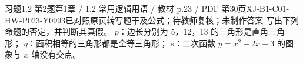\par\noindent\begin{minipage}{\linewidth}
\begin{bankitem}{习题1.2 第2题}{第1章 / 1.2 常用逻辑用语 / 教材 p.23 / PDF 第30页}{XJ-B1-C01-HW-P023-Y0993}{已对照原页转写题干及公式；待教师复核；未制作答案}
写出下列命题的否定，并判断其真假。
$p$：边长分别为 5，12，13 的三角形是直角三角形；
$q$：面积相等的三角形都是全等三角形；
$s$：二次函数 $y=x^2-2x+3$ 的图象与 $x$ 轴没有交点。
\end{bankitem}
\end{minipage}\par\medskip
